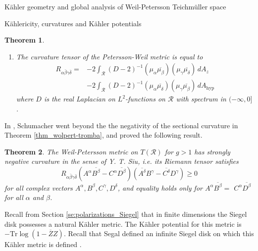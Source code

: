 \documentclass[12pt]{amsart}
\theoremstyle{plain}
\newtheorem{theorem}{Theorem}[section]
\theoremstyle{definition}
\theoremstyle{remark}
\numberwithin{equation}{section} %
\numberwithin{figure}{section} %
\begin{document}
\begin{section}{K\"ahler geometry and global analysis of Weil-Petersson Teichm\"uller space}
\begin{subsection}{K\"ahlericity, curvatures and K\"ahler potentials}
\begin{theorem}
\begin{enumerate}[font=\upshape]
\item The curvature tensor of the Petersson-Weil metric is equal to
\begin{equation}
\begin{aligned} R_{\alpha \bar{\beta} \gamma \bar{\delta}}= & -2 \int_{\mathscr{R}}(D-2)^{-1}\left(\mu_{\alpha} \overline{\mu_{\beta}}\right)\left(\mu_{\gamma} \overline{\mu_{\delta}}\right) \, dA_z \\ & -2 \int_{\mathscr{R}}(D-2)^{-1}\left(\mu_{\alpha} \overline{\mu_{\delta}}\right)\left(\mu_{\gamma} \overline{\mu_{\beta}}\right) \, dA_{\mathrm{hyp}}\end{aligned}
\end{equation}
where \(D\) is the real Laplacian on \(L^{2}\)-functions on \(\mathscr{R}\) with spectrum in $(-\infty, 0]$.
\end{enumerate}
\end{theorem}
In \cite{Schumacher}, Schumacher went beyond the the negativity of the sectional curvature in Theorem \ref{thm_wolpert-tromba}, and proved the following result.
\begin{theorem}
The Weil-Petersson metric on \(T(\mathscr{R})\) for \(g>1\) has
strongly negative curvature in the sense of \emph{Y. T. Siu}, i.e. its Riemann tensor satisfies
$$
R_{\alpha \bar{\beta} \gamma \bar{\delta}}\left(A^{\alpha} \overline{B^{\beta}}-C^{\alpha} \overline{D^{\beta}}\right)\left(\overline{A^{\delta}} B^{\gamma}-\overline{C^{\delta}} D^{\gamma}\right) \geq 0
$$
for all complex vectors \(A^{\alpha}, B^{\beta}, C^{\gamma}, D^{\delta}\), and equality holds only for \(A^{\alpha} \overline{B^{\beta}}=\)
\(C^{\alpha} \overline{D^{\beta}}\) for all \(\alpha\) and \(\beta\).
\end{theorem}


{Recall from Section \ref{se:polarizations_Siegel} that in finite 
dimensions the Siegel disk possesses a natural K\"ahler metric. The K\"ahler potential for this metric is   $-\mathrm{Tr} \log{(1-\overline{Z} Z)}$. Recall that Segal defined an infinite Siegel disk on which this K\"ahler metric is defined \cite{SegalUnitary}.

}
\end{subsection}
\end{section}
\end{document}
